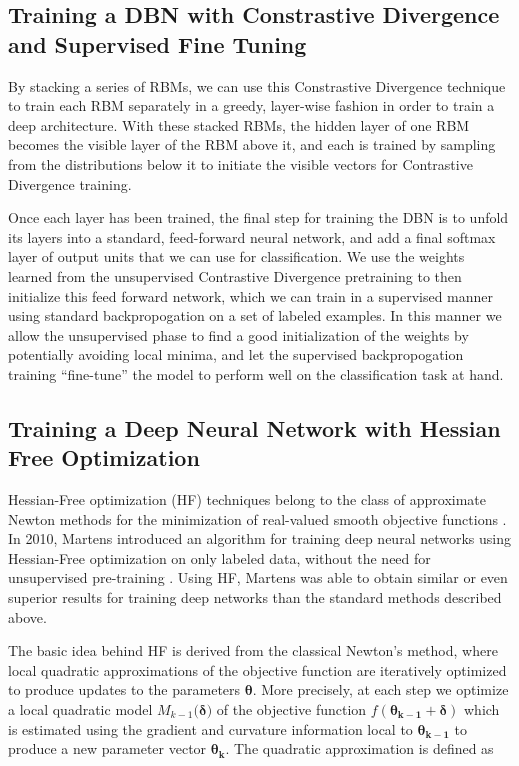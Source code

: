 \documentclass{article}
\begin{document}
\subsection{Training a DBN with Constrastive Divergence and Supervised Fine Tuning}

By stacking a series of RBMs, we can use this Constrastive Divergence technique
to train each RBM separately in a greedy, layer-wise fashion in order to train
a deep architecture. With these stacked RBMs, the hidden layer of one RBM
becomes the visible layer of the RBM above it, and each is trained by sampling
from the distributions below it to initiate the visible vectors for
Contrastive Divergence training.

Once each layer has been trained, the final step for training the DBN is to
unfold its layers into a standard, feed-forward neural network, and add a final
softmax layer of output units that we can use for classification. We use the
weights learned from the unsupervised Contrastive Divergence pretraining to
then initialize this feed forward network, which we can train in a supervised
manner using standard backpropogation on a set of labeled examples. In this
manner we allow the unsupervised phase to find a good initialization of the
weights by potentially avoiding local minima, and let the supervised
backpropogation training ``fine-tune'' the model to perform well on the
classification task at hand.

\subsection{Training a Deep Neural Network with Hessian Free Optimization}

Hessian-Free optimization (HF) techniques belong to the class of approximate
Newton methods for the minimization of real-valued smooth objective functions
\cite{martens2012training}. In 2010, Martens introduced an algorithm for
training deep neural networks using Hessian-Free optimization on only labeled
data, without the need for unsupervised pre-training \cite{martens2010deep}.
Using HF, Martens was able to obtain similar or even superior results for
training deep networks than the standard methods described above. 

The basic idea behind HF is derived from the classical Newton's method, where
local quadratic approximations of the objective function are iteratively
optimized to produce updates to the parameters $\mathbf{\theta}$.  More
precisely, at each step we optimize a local quadratic model
$M_{k-1}(\mathbf{\delta)}$ of the objective function $f(\mathbf{\theta_{k-1}} +
\mathbf{\delta})$ which is estimated using the gradient and curvature
information local to $\mathbf{\theta_{k-1}}$ to produce a new parameter vector
$\mathbf{\theta_k}$. The quadratic approximation is defined as
\end{document}
